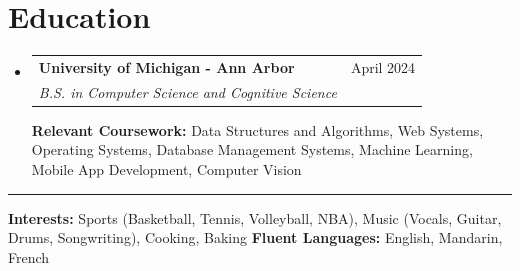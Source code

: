 \documentclass[letterpaper,11pt]{article}
\makeatletter
\newcommand{\resumeSubheading}[4]{
  \vspace{-2pt}\item
    \begin{tabular*}{0.97\textwidth}[t]{l@{\extracolsep{\fill}}r}
      \textbf{#1} & #2 \\
      \textit{\small#3} & \textit{\small #4} \\
    \end{tabular*}\vspace{-7pt}
}
\newcommand{\resumeSubHeadingListStart}{\begin{itemize}[leftmargin=0.15in, label={}]}
\newcommand{\resumeSubHeadingListEnd}{\end{itemize}}
\makeatother
\begin{document}
\section{Education}
  \resumeSubHeadingListStart
    \resumeSubheading
      {University of Michigan - Ann Arbor}{April 2024}
      {B.S. in Computer Science and Cognitive Science}{}\vspace{10pt}
        \newline
        \small \textbf{Relevant Coursework:} \small Data Structures and Algorithms, Web Systems, Operating Systems, Database Management Systems, Machine Learning, Mobile App Development, Computer Vision
  \resumeSubHeadingListEnd

          \rule{\linewidth}{0.3pt}


    \footnotesize
    \textbf{Interests:} Sports (Basketball, Tennis, Volleyball, NBA), Music (Vocals, Guitar, Drums, Songwriting), Cooking, Baking
    \newline
    \textbf{Fluent Languages:} English, Mandarin, French
\end{document}
